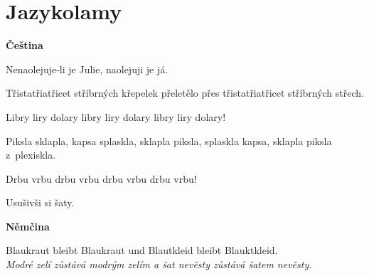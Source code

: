
\section{Jazykolamy}

\noindent
\textbf{Čeština}

\medskip

\noindent
Nenaolejuje-li je Julie, naolejuji je já.

\noindent
Třistatřiatřicet stříbrných křepelek přeletělo přes třistatřiatřicet stříbrných střech.

\noindent
Libry liry dolary libry liry dolary libry liry dolary!

\noindent
Piksla sklapla, kapsa splaskla, sklapla piksla, splaskla kapsa, sklapla piksla z plexiskla.

\noindent
Drbu vrbu drbu vrbu drbu vrbu drbu vrbu!

\noindent
Usušivši si šaty.






\bigskip

\noindent
\textbf{Němčina}

\medskip

\noindent
Blaukraut bleibt Blaukraut und Blautkleid bleibt Blauktkleid. \\
\textit{Modré zelí zůstává modrým zelím a šat nevěsty zůstává šatem nevěsty.}

\medskip

